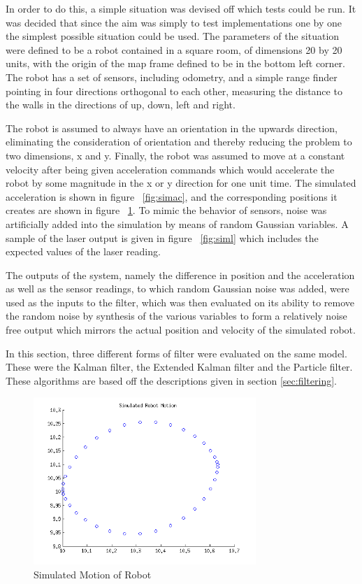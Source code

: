 \documentclass[english]{article}
\begin{document}
In order to do this, a simple situation was devised off which tests could be run. It was decided that since the aim was simply to test implementations one by one the simplest possible situation could be used. The parameters of the situation were defined to be a robot contained in a square room, of dimensions 20 by 20 units, with the origin of the map frame defined to be in the bottom left corner. The robot has a set of sensors, including odometry, and a simple range finder pointing in four directions orthogonal to each other, measuring the distance to the walls in the directions of up, down, left and right. 

The robot is assumed to always have an orientation in the upwards direction, eliminating the consideration of orientation and thereby reducing the problem to two dimensions, x and y. Finally, the robot was assumed to move at a constant velocity after being given acceleration commands which would accelerate the robot by some magnitude in the x or y direction for one unit time. The simulated acceleration is shown in figure ~\ref{fig:simac}, and the corresponding positions it creates are shown in figure ~\ref{fig:simmo}. To mimic the behavior of sensors, noise was artificially added into the simulation by means of random Gaussian variables. A sample of the laser output is given in figure ~\ref{fig:siml} which includes the expected values of the laser reading.

The outputs of the system, namely the difference in position and the acceleration as well as the sensor readings, to which random Gaussian noise was added, were used as the inputs to the filter, which was then evaluated on its ability to remove the random noise by synthesis of the various variables to form a relatively noise free output which mirrors the actual position and velocity of the simulated robot.

In this section, three different forms of filter were evaluated on the same model. These were the Kalman filter, the Extended Kalman filter and the Particle filter. These algorithms are based off the descriptions given in section \ref{sec:filtering}.

\begin{figure}[htp]
\label{fig:simmo}
\centering
 \includegraphics[width=0.75\textwidth]{images/simulatedmotion.png}
\caption{Simulated Motion of Robot}
\end{figure}
\end{document}

